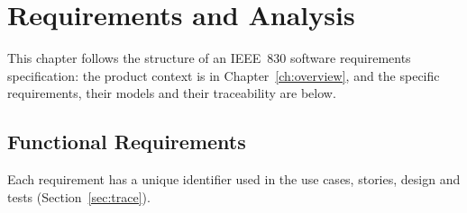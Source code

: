 
\chapter{Requirements and Analysis}
\label{ch:requirements}

This chapter follows the structure of an IEEE~830 software requirements
specification: the product context is in Chapter~\ref{ch:overview}, and the
specific requirements, their models and their traceability are below.

\section{Functional Requirements}

Each requirement has a unique identifier used in the use cases, stories,
design and tests (Section~\ref{sec:trace}).

